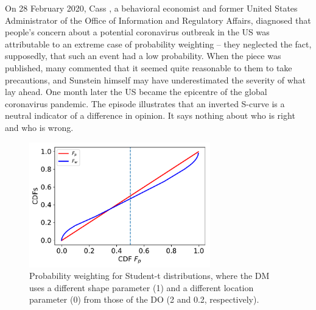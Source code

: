 \documentclass[a4paper, 12pt]{article}
\newcommand{\flabel}[1]{\label{fig:#1}}
\newcommand{\ND}{\mathcal{N}} %
\begin{document}
On 28 February 2020, Cass \citet{Sunstein2020}, a behavioral economist and former United States Administrator of the Office of Information and Regulatory Affairs, diagnosed that people's concern about a potential coronavirus outbreak in the US was attributable to an extreme case of probability weighting -- they neglected the fact, supposedly, that such an event had a low probability. When the piece was published, many commented that it seemed quite reasonable to them to take precautions, and Sunstein himself may have underestimated the severity of what lay ahead. One month later the US became the epicentre of the global coronavirus pandemic.
The episode illustrates that an inverted S-curve is a neutral indicator of a difference in opinion. It says nothing about who is right and who is wrong.

\begin{figure}[htb]
\centering
\includegraphics[width=0.7\textwidth]{./figs/Student-t.pdf}
\caption{Probability weighting for Student-t distributions, where the DM uses a different shape parameter (1) and a different location parameter (0) from those of the DO (2 and 0.2, respectively).}
\flabel{fat_tailed_CDF}
\end{figure}


\end{document}
